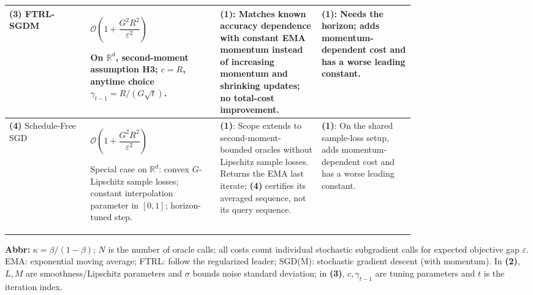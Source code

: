 \begin{table}[tp]
\begin{threeparttable}
\begin{tabularx}{\linewidth}{@{}>{\raggedright\arraybackslash}p{0.20\linewidth}>{\raggedright\arraybackslash}p{0.32\linewidth}>{\raggedright\arraybackslash}p{0.25\linewidth}>{\raggedright\arraybackslash}X@{}}
\midrule
\textbf{(3)} FTRL-SGDM \citep[Cor.~1]{mlcLiLiuOrabona2022}
& $\mathcal{O}\!\left(1+\dfrac{G^2R^2}{\varepsilon^2}\right)$\par On $\mathbb R^d$, second-moment assumption H3; $c=R$, anytime choice $\gamma_{t-1}=R/(G\sqrt t)$.
& \textbf{(1)}: Matches known accuracy dependence with constant EMA momentum instead of increasing momentum and shrinking updates; no total-cost improvement.
& \textbf{(1)}: Needs the horizon; adds momentum-dependent cost and has a worse leading constant. \\
\midrule
\textbf{(4)} Schedule-Free SGD \citep[Thm.~1]{mlcDefazio2024v4}
& $\mathcal{O}\!\left(1+\dfrac{G^2R^2}{\varepsilon^2}\right)$\par Special case on $\mathbb R^d$: convex $G$-Lipschitz sample losses; constant interpolation parameter in $[0,1]$; horizon-tuned step.
& \textbf{(1)}: Scope extends to second-moment-bounded oracles without Lipschitz sample losses. Returns the EMA last iterate; \textbf{(4)} certifies its averaged sequence, not its query sequence.
& \textbf{(1)}: On the shared sample-loss setup, adds momentum-dependent cost and has a worse leading constant. \\
\bottomrule
\end{tabularx}
\begin{tablenotes}[flushleft]\footnotesize
\item[] \textbf{Abbr:} $\kappa=\beta/(1-\beta)$; $N$ is the number of oracle calls; all costs count individual stochastic subgradient calls for expected objective gap $\varepsilon$. EMA: exponential moving average; FTRL: follow the regularized leader; SGD(M): stochastic gradient descent (with momentum). In \textbf{(2)}, $L,M$ are smoothness/Lipschitz parameters and $\sigma$ bounds noise standard deviation; in \textbf{(3)}, $c,\gamma_{t-1}$ are tuning parameters and $t$ is the iteration index.
\end{tablenotes}
\end{threeparttable}
\end{table}
\clearpage
